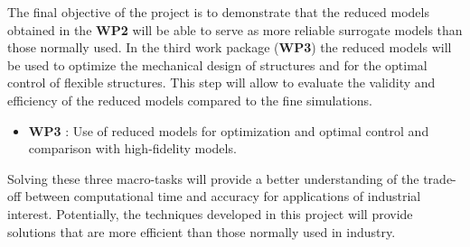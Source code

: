 \documentclass[12pt]{article}
\begin{document}
	The final objective of the project is to demonstrate that the reduced models obtained in the \textbf{WP2} will be able to serve as more reliable surrogate models than those normally used. In the third work package (\textbf{WP3}) the reduced models will be used to optimize the mechanical design of structures and for the optimal control of flexible structures. This step will allow to evaluate the validity and efficiency of the reduced models compared to the fine simulations. \\
	
	\begin{itemize}
		\item \textbf{WP3} : Use of reduced models for optimization and optimal control and comparison with high-fidelity models. \\
	\end{itemize}
	
	Solving these three macro-tasks will provide a better understanding of the trade-off between computational time and accuracy for applications of industrial interest. Potentially, the techniques developed in this project will provide solutions that are more efficient than those normally used in industry. 
	
	
	
	
	
	
\end{document}
